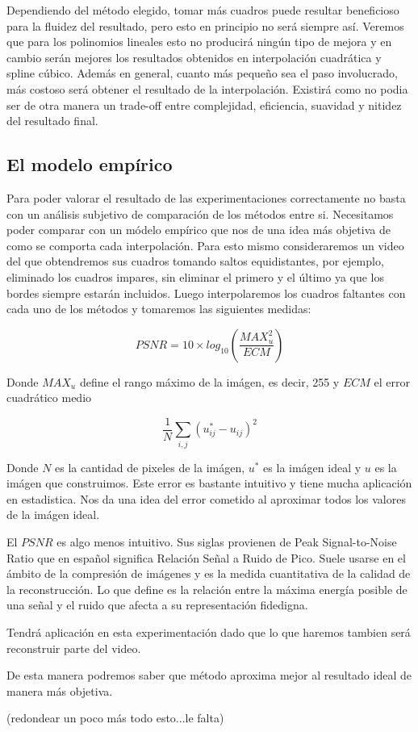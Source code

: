 Dependiendo del método elegido, tomar más cuadros puede resultar beneficioso para la fluidez del resultado, pero esto en principio no será siempre así. Veremos que para los polinomios lineales esto no producirá ningún tipo de mejora y en cambio serán mejores los resultados obtenidos en interpolación cuadrática y spline cúbico. Además en general, cuanto más pequeño sea el paso involucrado, más costoso será obtener el resultado de la interpolación. Existirá como no podia ser de otra manera un trade-off entre complejidad, eficiencia, suavidad y nitidez del resultado final. 
 
\subsection{El modelo empírico}

Para poder valorar el resultado de las experimentaciones correctamente no basta con un análisis subjetivo de comparación de los métodos entre si. Necesitamos poder comparar con un módelo empírico que nos de una idea más objetiva de como se comporta cada interpolación. Para esto mismo consideraremos un video del que obtendremos sus cuadros tomando saltos equidistantes, por ejemplo, eliminado los cuadros impares, sin eliminar el primero y el último ya que los bordes siempre estarán incluidos. Luego interpolaremos los cuadros faltantes con cada uno de los métodos y tomaremos las siguientes medidas:

\begin{equation}
	PSNR = 10 \times log_{10}(\dfrac{MAX_u^2}{ECM})
\end{equation}

Donde $MAX_u$ define el rango máximo de la imágen, es decir, 255 y $ECM$ el error cuadrático medio

\begin{equation}
	\dfrac{1}{N}\sum_{i,j}(u_{ij}^* - u_{ij})^2
\end{equation}

Donde $N$ es la cantidad de pixeles de la imágen, $u^*$ es la imágen ideal y $u$ es la imágen que construimos. Este error es bastante intuitivo y tiene mucha aplicación en estadistica. Nos da una idea del error cometido al aproximar todos los valores de la imágen ideal. 

El $PSNR$ es algo menos intuitivo. Sus siglas provienen de Peak Signal-to-Noise Ratio que en español significa Relación Señal a Ruido de Pico. Suele usarse en el ámbito de la compresión de imágenes y es la medida cuantitativa de la calidad de la reconstrucción. Lo que define es la relación entre la máxima energía posible de una señal y el ruido que afecta a su representación fidedigna. 

Tendrá aplicación en esta experimentación dado que lo que haremos tambien será reconstruir parte del video.

De esta manera podremos saber que método aproxima mejor al resultado ideal de manera más objetiva. 

(redondear un poco más todo esto...le falta)










